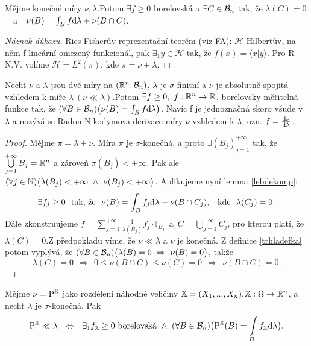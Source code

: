 \begin{lemma}\label{lebdekomp}
	Mějme konečné míry $\nu,\lambda$.\newline Potom $\exists f \geq 0$ borelovská a $\exists C \in\mathcal{B}_n$ tak, že $\lambda(C)=0$~~a~~$ \nu(B)=\int_B f \mathrm{d}\lambda + \nu(B \cap C) $.
	\begin{proof}[Náznak důkazu]
		Ries-Fisherův reprezentační teorém (viz FA): $\mathcal{H}$ Hilbertův, na něm f lineární omezený funkcionál, pak $\exists_1  y \in\mathcal{H}$ tak, že $f(x)=\langle x|y\rangle$. Pro R-N.V. volíme $\mathcal{H}=L^2(\pi)$, kde $\pi=\nu+\lambda$.
	\end{proof}
\end{lemma}
\begin{theorem}
	Nechť $ \nu $ a $ \lambda $ jsou dvě míry na $
	(\mathbb{R}^n,\mathcal{B}_n)$, $\lambda$ je $\sigma$-finitní a $\nu$ je absolutně spojitá vzhledem k míře $\lambda~(\nu\ll \lambda)$.\newline Potom $\exists f\geq 0,~f:\mathbb{R}^n\to\mathbb{R}$, borelovsky měřitelná funkce tak, že $(\forall B \in \mathcal{B}_n)\bigl(\nu(B)=\int_B f\mathrm{d}\lambda\bigr)$.
	Navíc f je jednoznačná skoro všude v $\lambda$ a nazývá se Radon-Nikodymova derivace míry $\nu$ vzhledem k $\lambda$, ozn. $f=\frac{\mathrm{d}\nu}{\mathrm{d}\lambda}$.
	\begin{proof}
		 Mějme $\pi=\lambda+\nu$. Míra $\pi$ je $\sigma$-konečná, a proto $\exists(B_j)_{j=1}^{+\infty}$ tak, že $\bigcup\limits_{j=1}^{+\infty} B_j=\mathbb{R}^n$ a zároveň $\pi(B_j)<+\infty$. Pak ale $(\forall j\in\mathbb{N})\bigl(\lambda(B_j)< +\infty~\wedge~\nu(B_j)<+\infty\bigr)$. Aplikujeme nyní lemma \ref{lebdekomp}: 
		 $$\exists f_j \geq 0\text{~~tak, že~~}\nu(B)=\int_{B} f_j \mathrm{d}\lambda + \nu(B\cap C_j)\text{, ~~kde~~}\lambda(C_j)=0.$$ 
		 Dále zkonstruujeme $f=\sum\limits_{j=1}^{+\infty} \frac{1}{\lambda(B_j)}f_j \cdot \mathbb{I}_{B_j} $~a~$ C=\bigcup\limits_{j=1}^{+\infty} C_j$, pro kterou platí, že $ \lambda(C)=0 $.\newline Z předpokladu víme, že $\nu\ll \lambda$ a $\nu$ je konečná. Z definice \ref{trhladefka} potom vyplývá, že \newline$(\forall B \in\mathcal{B}_n)\bigl(\lambda(B)=0 ~\Rightarrow~ \nu(B)=0\bigr)$, takže
		 $$\lambda(C)=0~~\Rightarrow~~0\leq \nu(B\cap C) \leq \nu(C)=0 ~~\Rightarrow~ ~\nu(B\cap C)=0.$$	\end{proof}
\end{theorem}
\begin{remark}
	Mějme $\nu=\mathrm{P}^{\mathbb{X}}$ jako rozdělení náhodné veličiny $\mathbb{X}=(X_1,...,X_n),$\newline$\mathbb{X}:\Omega\to\mathbb{R}^n$, a nechť $\lambda$ je $\sigma$-konečná. Pak $$\mathrm{P}^{\mathbb{X}}\ll \lambda~~\Leftrightarrow ~~\exists_1  f_{\mathbb{X}}\geq 0\text{ borelovská} ~\wedge ~(\forall B \in\mathcal{B}_n)\bigl(\mathrm{P}^{\mathbb{X}}(B)=\int\limits_{B}f_{\mathbb{X}} \mathrm{d}\lambda\bigr).$$
\end{remark}
